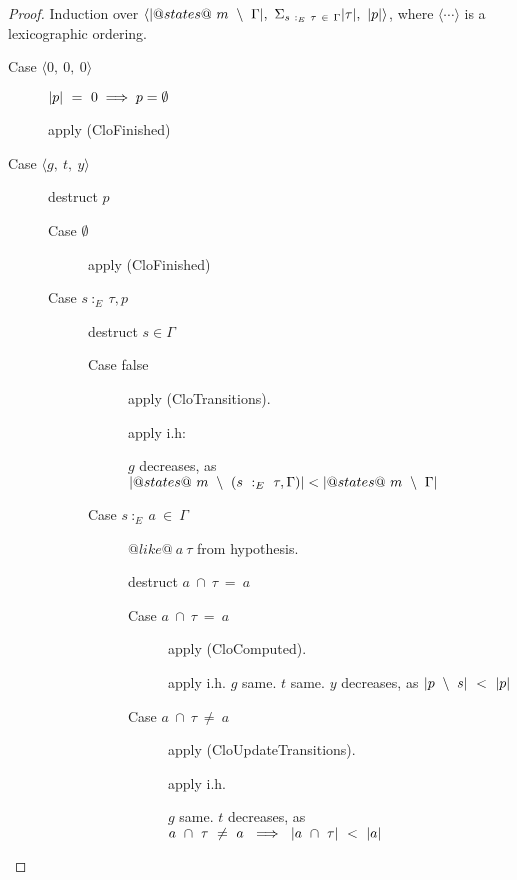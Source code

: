 \begin{proof}
Induction over $\langle |@states@~m~\setminus~\Gamma|,~\Sigma_{s~:_E~\tau~\in~\Gamma}|\tau|,~|p| \rangle$, where $\langle \cdots \rangle$ is a lexicographic ordering.

\begin{description}
\item[Case $\langle 0,~0,~0 \rangle$]

$|p|~=~0 \implies p=\emptyset$

apply (CloFinished)

\item[Case $\langle g,~t,~y \rangle$]

destruct $p$
\begin{description}
\item[Case $\emptyset$]

apply (CloFinished)

\item[Case $s~:_E~\tau, p$]

destruct $s \in \Gamma$
\begin{description}
\item[Case false]

apply (CloTransitions).

apply i.h:

$g$ decreases, as
$|@states@~m~\setminus~(s~:_E~\tau, \Gamma)| < |@states@~m~\setminus~\Gamma|$

\item[Case $s~:_E~a~\in~\Gamma$]

$@like@~a~\tau$ from hypothesis.

destruct $a~\cap~\tau~=~a$
\begin{description}
\item[Case $a~\cap~\tau~=~a$]

apply (CloComputed).

apply i.h.
$g$ same. $t$ same. $y$ decreases, as $|p~\setminus~s|~<~|p|$

\item[Case $a~\cap~\tau~\not=~a$]

apply (CloUpdateTransitions).

apply i.h.

$g$ same. $t$ decreases, as
$a~\cap~\tau~\not=~a~\implies~|a~\cap~\tau|~<~|a|$

\end{description}
\end{description}
\end{description}
\end{description}
    


\end{proof}

